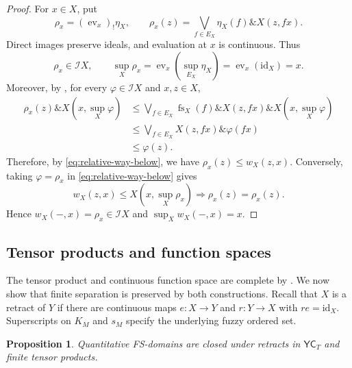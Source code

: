 \documentclass[preprint,3p,times]{elsarticle}
\newtheorem{proposition}[proposition]{Proposition}
\theoremstyle{definition}
\theoremstyle{remark}
\newcommand{\I}{\mathcal{I}}
\newcommand{\FS}{\mathsf{FS}}
\newcommand{\CONT}{\mathsf{CONT}}
\newcommand{\YC}{\mathsf{YC}}
\newcommand{\id}{\mathrm{id}}
\newcommand{\supop}{\operatorname{sup}}
\newcommand{\fs}{\operatorname{fs}}
\newcommand{\ev}{\operatorname{ev}}
\newcommand{\subdeg}{\operatorname{sub}}
\newcommand{\tn}{\mathbin{\&}}
\numberwithin{equation}{section}
\begin{document}
\begin{proof}
For \(x\in X\), put
\[
 \rho_x=(\ev_x)_!\eta_X,
 \qquad
 \rho_x(z)=\bigvee_{f\in E_X}\eta_X(f)\tn X(z,fx).
\]
Direct images preserve ideals, and evaluation at \(x\) is continuous.
Thus
\[
 \rho_x\in\I X,\qquad
 \supop_X\rho_x
 =\ev_x(\supop_{E_X}\eta_X)
 =\ev_x(\id_X)=x.
\]
Moreover, by , for every \(\varphi\in\I X\) and \(x,z\in X\),
\begin{align*}
 \rho_x(z)\tn X(x,\supop_X\varphi) 
     &\le \bigvee_{f\in E_X}\fs_X(f)\tn X(z,fx)\tn X(x,\supop_X\varphi)\\
     &\le \bigvee_{f\in E_X}X(z,fx)\tn\varphi(fx)\\
     &\le \varphi(z).
\end{align*}
Therefore, by \eqref{eq:relative-way-below}, we have
\(
    \rho_x(z)\le w_X(z,x).
\)
Conversely, taking \(\varphi=\rho_x\) in \eqref{eq:relative-way-below} gives
\[
 w_X(z,x)\leq X(x,\supop_X\rho_x)\Rightarrow\rho_x(z)
 =\rho_x(z).
\]
Hence \(w_X(-,x)=\rho_x\in\I X\) and
\(\supop_Xw_X(-,x)=x\).
\end{proof}


\subsection{Tensor products and function spaces}\label{sec:function-spaces}

The tensor product and continuous function space are complete by . We now show that finite separation is preserved by both constructions. Recall that \(X\) is a retract of \(Y\) if there are continuous maps \(e\colon X\to Y\) and \(r\colon Y\to X\) with \(re=\id_X\). Superscripts on \(K_M\) and \(s_M\) specify the underlying fuzzy ordered set.

\begin{proposition}\label{prop:retracts-tensor}
Quantitative FS-domains are closed under retracts in \(\YC_T\) and finite tensor products.
\end{proposition}
\end{document}
